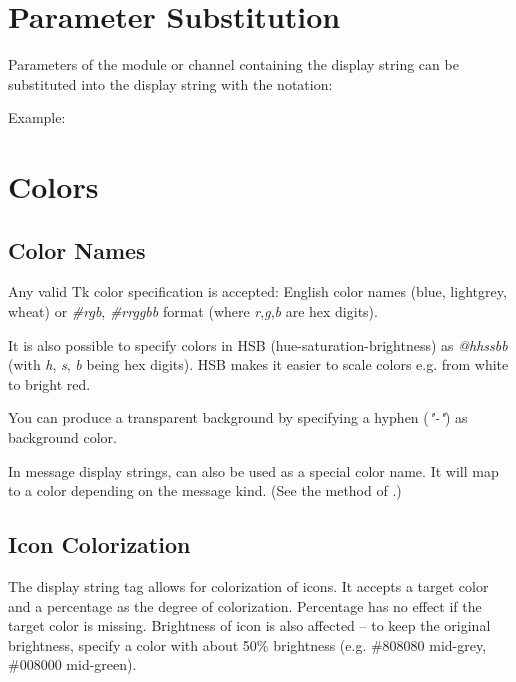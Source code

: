 

\section{Parameter Substitution}

Parameters of the module or channel containing the
display string can be substituted into the display string
with the  notation:

Example:


\section{Colors}
\label{sec:ch-graphics:colors}

\subsection{Color Names}

Any valid Tk color specification is accepted: English color names
(blue, lightgrey, wheat) or \textit{\#rgb}, \textit{\#rrggbb} format
(where \textit{r},\textit{g},\textit{b} are hex digits).

It is also possible to specify colors in HSB (hue-saturation-brightness) as
\textit{@hhssbb} (with \textit{h}, \textit{s}, \textit{b} being hex digits).
HSB makes it easier to scale colors e.g. from white to bright red.

You can produce a transparent background by specifying a hyphen (\textit{"-"})
as background color.

In message display strings,  can also be used as a special color name.
It will map to a color depending on the message kind.
(See the  method of .)

\subsection{Icon Colorization}

The  display string tag allows for colorization of icons.
It accepts a target color and a percentage as the degree of colorization.
Percentage has no effect if the target color is missing.
Brightness of icon is also affected -- to keep the original brightness,
specify a color with about 50\% brightness (e.g. \#808080 mid-grey,
\#008000 mid-green).

